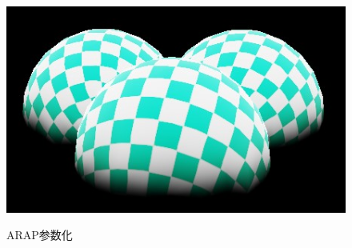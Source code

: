 \documentclass{article}
\begin{document}
\begin{figure}[htbp]
\begin{minipage}{0.24\linewidth}
			\label{chutian2}%
		\end{minipage}
		\begin{minipage}{0.24\linewidth}
			\centering
			\caption{ARAP参数化}
			\includegraphics[width=1\linewidth]{balls_arap_tex.JPG}
			\label{chutian2}%
		\end{minipage}
	\end{figure}
	\clearpage
	
\end{document}
